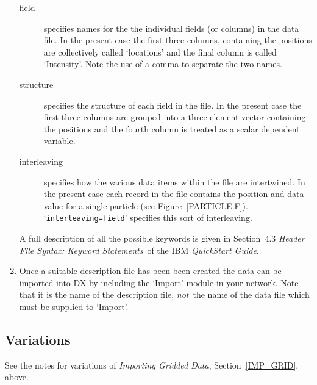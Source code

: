 \documentclass[twoside,11pt]{starlink}
\begin{document}
\begin{enumerate}
\begin{description}
    \item[field] specifies names for the the individual fields (or columns) in
     the data file. In the present case the first three columns,
     containing the positions are collectively called `locations' and
     the final column is called `Intensity'. Note the use of a comma to
     separate the two names.

    \item[structure] specifies the structure of each field in the file.
     In the present case the first three columns are grouped into a
     three-element vector containing the positions and the fourth
     column is treated as a scalar dependent variable.

    \item[interleaving] specifies how the various data items within
     the file are intertwined. In the present case each record in the
     file contains the position and data value for a single particle
     (see Figure~\ref{PARTICLE.F}). `\texttt{interleaving=field}'
     specifies this sort of interleaving.

  \end{description}

   A full description of all the possible keywords is given in
   Section~4.3 \textit{Header File Syntax: Keyword Statements}\, of the
   IBM \textit{QuickStart Guide}\cite{QUICKS}.

  \newpage
  \item Once a suitable description file has been been created the data
   can be imported into DX by including the `Import' module in your
   network. Note that it is the name of the description file, \textit{not}\,
   the name of the data file which must be supplied to `Import'.

\end{enumerate}

\subsection{Variations}

See the notes for variations of \textit{Importing Gridded Data},
Section~\ref{IMP_GRID}, above.
\end{document}
